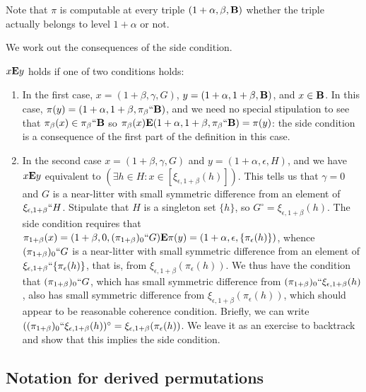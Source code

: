 \documentclass[12pt]{article}
\begin{document}
Note that $\pi$ is computable at every triple $(1+\alpha,\beta,{\bf B})$ whether the triple actually belongs to level $1+\alpha$ or not.

We work out the consequences of the side condition.

$x {\bf E} y$ holds if one of two conditions holds:

\begin{enumerate}

\item  In the first case, $x=(1+\beta,\gamma,G)$, $y = (1+\alpha,1+\beta,{\bf B})$, and $x \in {\bf B}$.  In this case, $\pi(y) = (1+\alpha,1+\beta,\pi_\beta``{\bf B})$,
and we need no special stipulation to see that $\pi_{\beta}(x) \in \pi_{\beta}``{\bf B}$ so $\pi_\beta(x) {\bf E}  (1+\alpha,1+\beta,\pi_\beta``{\bf B}) = \pi(y)$:  the side condition is a consequence of the first part of the definition in this case.

\item  In the second case $x=(1+\beta,\gamma,G)$ and $y=(1+\alpha,\epsilon,H)$, and we have $x {\bf E} y$ equivalent to $(\exists h \in H:x \in [\xi_{\epsilon,1+\beta}(h)])$.
This tells us that $\gamma=0$ and $G$ is a near-litter with small symmetric difference from an element of $\xi_{\epsilon,1+\beta}``H$.  Stipulate that $H$ is a singleton set
$\{h\}$, so $G^{\circ} = \xi_{\epsilon,1+\beta}(h)$.   The side condition requires that $\pi_{1+\beta}(x) = (1+\beta,0,(\pi_{1+\beta})_0``G) {\bf E} \pi(y) = (1+\alpha,\epsilon,\{\pi_\epsilon(h)\})$, whence
$(\pi_{1+\beta})_0``G$ is a near-litter with small symmetric difference from an element of $\xi_{\epsilon,1+\beta}``\{\pi_\epsilon(h)\}$, that is, from $\xi_{\epsilon,1+\beta}(\pi_\epsilon(h))$.   We thus have the condition that  $(\pi_{1+\beta})_0``G$, which has small symmetric difference from $(\pi_{1+\beta})_0``\xi_{\epsilon,1+\beta}(h)$, also  has small symmetric difference from  $\xi_{\epsilon,1+\beta}(\pi_\epsilon(h))$, which should appear to be reasonable coherence condition.  Briefly, we can write  $((\pi_{1+\beta})_0``\xi_{\epsilon,1+\beta}(h))^{\circ}=\xi_{\epsilon,1+\beta}(\pi_\epsilon(h))$.  We leave it as an exercise to backtrack and show that this implies the side condition.

\end{enumerate}

\subsection{Notation for derived permutations}
\end{document}
